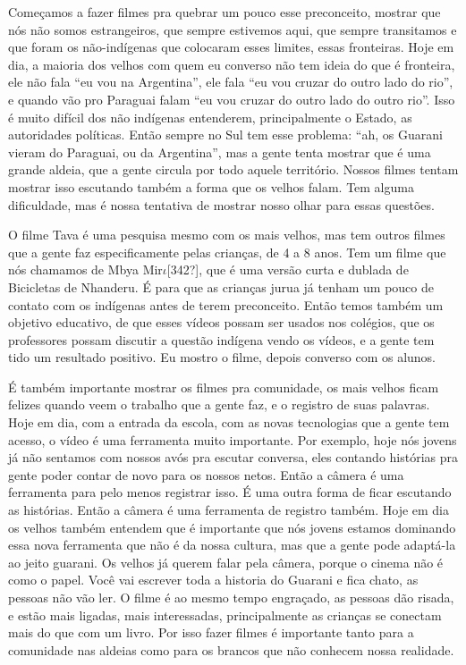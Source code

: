 \documentclass{article}
\begin{document}
Come\c{c}amos a fazer filmes pra quebrar um pouco esse preconceito,
mostrar que n\'os n\~ao somos estrangeiros, que sempre estivemos aqui,
que sempre transitamos e que foram os n\~ao-ind\'igenas que colocaram
esses limites, essas fronteiras. Hoje em dia, a maioria dos velhos com
quem eu converso n\~ao tem ideia do que \'e fronteira, ele n\~ao fala
{\textquotedblleft}eu vou na Argentina{\textquotedblright}, ele fala
{\textquotedblleft}eu vou cruzar do outro lado do
rio{\textquotedblright}, e quando v\~ao pro Paraguai falam
{\textquotedblleft}eu vou cruzar do outro lado do outro
rio{\textquotedblright}. Isso \'e muito dif\'icil dos n\~ao ind\'igenas
entenderem, principalmente o Estado, as autoridades pol\'iticas.
Ent\~ao sempre no Sul tem esse problema: {\textquotedblleft}ah, os
Guarani vieram do Paraguai, ou da Argentina{\textquotedblright}, mas a
gente tenta mostrar que \'e uma grande aldeia, que a gente circula por
todo aquele territ\'orio. Nossos filmes tentam mostrar isso escutando
tamb\'em a forma que os velhos falam. Tem alguma dificuldade, mas \'e
nossa tentativa de mostrar nosso olhar para essas quest\~oes.

O filme Tava \'e uma pesquisa mesmo com os mais velhos, mas tem outros
filmes que a gente faz especificamente pelas crian\c{c}as, de 4 a 8
anos. Tem um filme que n\'os chamamos de Mbya Mir$\iota $[342?], que
\'e uma vers\~ao curta e dublada de Bicicletas de Nhanderu. \'E para
que as crian\c{c}as jurua j\'a tenham um pouco de contato com os
ind\'igenas antes de terem preconceito. Ent\~ao temos tamb\'em um
objetivo educativo, de que esses v\'ideos possam ser usados nos
col\'egios, que os professores possam discutir a quest\~ao ind\'igena
vendo os v\'ideos, e a gente tem tido um resultado positivo. Eu mostro
o filme, depois converso com os alunos. 

\'E tamb\'em importante mostrar os filmes pra comunidade, os mais velhos
ficam felizes quando veem o trabalho que a gente faz, e o registro de
suas palavras. Hoje em dia, com a entrada da escola, com as novas
tecnologias que a gente tem acesso, o v\'ideo \'e uma ferramenta muito
importante. Por exemplo, hoje n\'os jovens j\'a n\~ao sentamos com
nossos av\'os pra escutar conversa, eles contando hist\'orias pra gente
poder contar de novo para os nossos netos. Ent\~ao a c\^amera \'e uma
ferramenta para pelo menos registrar isso. \'E uma outra forma de ficar
escutando as hist\'orias. Ent\~ao a c\^amera \'e uma ferramenta de
registro tamb\'em. Hoje em dia os velhos tamb\'em entendem que \'e
importante que n\'os jovens estamos dominando essa nova ferramenta que
n\~ao \'e da nossa cultura, mas que a gente pode adapt\'a-la ao jeito
guarani. Os velhos j\'a querem falar pela c\^amera, porque o cinema
n\~ao \'e como o papel. Voc\^e vai escrever toda a historia do Guarani
e fica chato, as pessoas n\~ao v\~ao ler. O filme \'e ao mesmo tempo
engra\c{c}ado, as pessoas d\~ao risada, e est\~ao mais ligadas, mais
interessadas, principalmente as crian\c{c}as se conectam mais do que
com um livro. Por isso fazer filmes \'e importante tanto para a
comunidade nas aldeias como para os brancos que n\~ao conhecem nossa
realidade.
\end{document}
